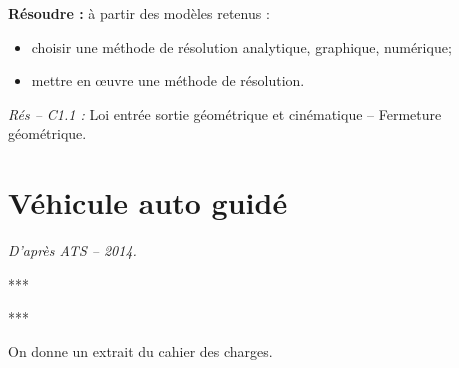 \documentclass[10pt]{article}
\newif\ifprof
\begin{document}






\begin{comp}
\noindent \textbf{Résoudre :} à partir des modèles retenus :
\begin{itemize}
\item choisir une méthode de résolution analytique, graphique, numérique;
\item mettre en \oe{}uvre une méthode de résolution.
\end{itemize}

\noindent \textit{Rés -- C1.1 :} Loi entrée sortie géométrique et cinématique -- Fermeture géométrique.

\end{comp}

\section*{Véhicule auto guidé}

\begin{flushright}
\textit{D'après ATS -- 2014.}
\end{flushright}




\begin{minipage}[c]{.7\linewidth}
***
\begin{obj} 
***
\end{obj}


 
\end{minipage} \hfill
\begin{minipage}[c]{.25\linewidth}
\begin{center}
\end{center}
\end{minipage}

\ifprof
\else
 On donne un extrait du cahier des charges.
\end{document}
